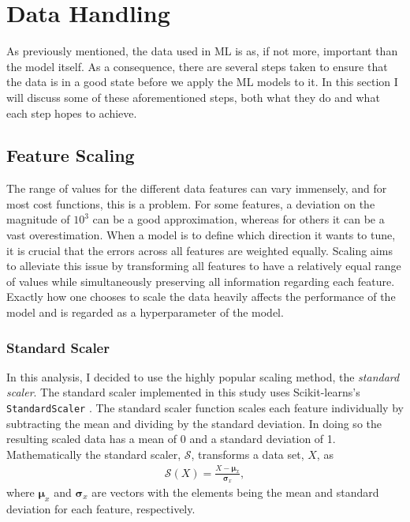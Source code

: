 \section{Data Handling}\label{subsec:Scaling}
As previously mentioned, the data used in \ac{ML} is as, if not more, important than the model itself. 
As a consequence, there are several steps taken to ensure that the data is in a good state before 
we apply the \ac{ML} models to it. In this section I will discuss some of these aforementioned steps, both 
what they do and what each step hopes to achieve.
\subsection{Feature Scaling}
The range of values for the different data features can vary immensely, and for most 
cost functions, this is a problem. For some features, a deviation on the magnitude 
of $10^3$ can be a good approximation, whereas for others it can be a vast 
overestimation. When a model is to define which direction it wants to tune, it is 
crucial that the errors across all features are weighted equally. Scaling aims to alleviate 
this issue by transforming all features to have a relatively equal range of values while
simultaneously preserving all information regarding each feature. Exactly how one chooses 
to scale the data heavily affects the performance of the model and is regarded as a hyperparameter 
of the model. 
\subsubsection{Standard Scaler}\label{subsubsec:StandardScalar}
In this analysis, I decided to use the highly popular scaling method, the \emph{standard scaler}. 
The standard scaler implemented in this study uses Scikit-learns's \texttt{StandardScaler}
\cite{StandardScaler}. The standard scaler function scales each feature individually by subtracting 
the mean and dividing by the standard deviation. In doing so the resulting scaled data has a mean 
of 0 and a standard deviation of 1. Mathematically the standard scaler, $\mathcal{S}$, transforms 
a data set, $X$, as 
\begin{align}
    \mathcal{S} \left(X\right) = \frac{X - \boldsymbol{\mu} _x}{\boldsymbol{\sigma}_x} ,
\end{align}
where $\boldsymbol{\mu} _x$ and $\boldsymbol{\sigma}_x$ are vectors with the elements being 
the mean and standard deviation for each feature, respectively.

